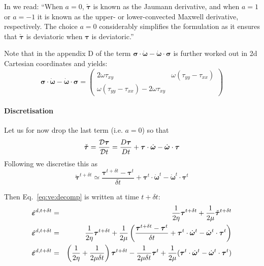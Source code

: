 In \cite{moql07} we read: ``When $a=0$, $\check{\bm \tau}$ is known as the Jaumann derivative, and
when $a=1$ or $a=-1$ it is known as the upper- or lower-convected Maxwell derivative, respectively. 
The choice $a=0$ considerably simplifies the formulation as it ensures 
that $\check{\bm \tau}$ is deviatoric when ${\bm \tau}$ is deviatoric.''

Note that in the appendix D of \cite{bepo10} the term ${\bm \sigma}\cdot \dot{\bm \omega} - \dot{\bm \omega}\cdot {\bm \sigma}$
is further worked out in 2d Cartesian coordinates and yields:
\[
{\bm \sigma}\cdot \dot{\bm \omega} - \dot{\bm \omega}\cdot {\bm \sigma}
=
\left(
\begin{array}{cc}
2 \omega \tau_{xy} & \omega (\tau_{yy}-\tau_{xx}) \\
\omega (\tau_{yy}-\tau_{xx}) -2 \omega \tau_{xy}
\end{array}
\right)
\]

\paragraph{Discretisation}

Let us for now drop the last term (i.e. $a=0$) so that 
\[
\check{\bm\tau} = 
\frac{{\cal D}{\bm \tau}}{{\cal D} t} = 
\frac{D {\bm \tau}}{D t}
+ {\bm \tau}\cdot \dot{\bm \omega} - \dot{\bm \omega}\cdot {\bm \tau}
\]
Following \cite{modm02} we discretise this as 
\[
\check{\bm\tau}^{t+\delta t} \simeq 
\frac{ {\bm\tau}^{t+\delta t}- {\bm\tau}^t   }{\delta t}
+ {\bm \tau}^t\cdot \dot{\bm \omega}^t - \dot{\bm \omega}^t \cdot {\bm \tau}^t
\]



Then Eq.~\eqref{eq:ve:decomp} is written at time $t+\delta t$:
\begin{eqnarray}
\dot{\bm \varepsilon}^{d,t+\delta t} 
&=& 
\frac{1}{2\eta} {\bm \tau}^{t+\delta t} + \frac{1}{2\mu} \check{\bm \tau}^{t+\delta t}  
\nonumber\\
\dot{\bm \varepsilon}^{d,t+\delta t} 
&=&
\frac{1}{2\eta} {\bm \tau}^{t+\delta t} + \frac{1}{2\mu} 
\left(
\frac{ {\bm\tau}^{t+\delta t}- {\bm\tau}^t   }{\delta t}
+ {\bm \tau}^t\cdot \dot{\bm \omega}^t - \dot{\bm \omega}^t \cdot {\bm \tau}^t
\right) 
\nonumber\\
\dot{\bm \varepsilon}^{d,t+\delta t} 
&=&
\left(\frac{1}{2\eta} + \frac{1}{2 \mu\delta t} \right){\bm \tau}^{t+\delta t} 
- \frac{1}{2 \mu\delta t}  {\bm\tau}^t 
+ \frac{1}{2 \mu} 
( {\bm \tau}^t\cdot \dot{\bm \omega}^t - \dot{\bm \omega}^t \cdot {\bm \tau}^t) \nonumber
\end{eqnarray}

